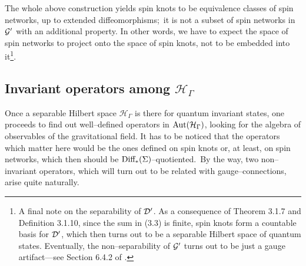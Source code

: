 The whole above construction yields spin knots to be equivalence classes of spin networks, up to extended diffeomorphisms;\, it is not a subset of spin networks in $\mathcal{G}'$ with an additional property. In other words, we have to expect the space of spin networks to project onto the space of spin knots, not to be embedded into it\footnote{A final note on the separability of $\mathcal{D}'$. As a consequence of Theorem 3.1.7 and Definition 3.1.10, since the sum in (3.3) is finite, spin knots form a countable basis for $\mathcal{D}'$, which then turns out to be a separable Hilbert space of quantum states. Eventually, the non--separability of $\mathcal{G}'$ turns out to be just a gauge artifact---see Section 6.4.2 of \cite{rov1}.}. 



\newpage
\subsection{Invariant operators among \texorpdfstring{$\mathcal{H}_\Gamma$}{a}}
Once a separable Hilbert space $\mathcal{H}_\Gamma$ is there for quantum invariant states, one proceeds to find out well--defined operators in $\text{\normalfont Aut}(\mathcal{H}_\Gamma)$, looking for the algebra of observables of the gravitational field. It has to be noticed that the operators which matter here would be the ones defined on spin knots or, at least, on spin networks, which then should be $\text{\normalfont Diff}_*(\Sigma)$--quotiented.\, By the way, two non--invariant operators, which will turn out to be related with gauge--connections, arise quite naturally.

